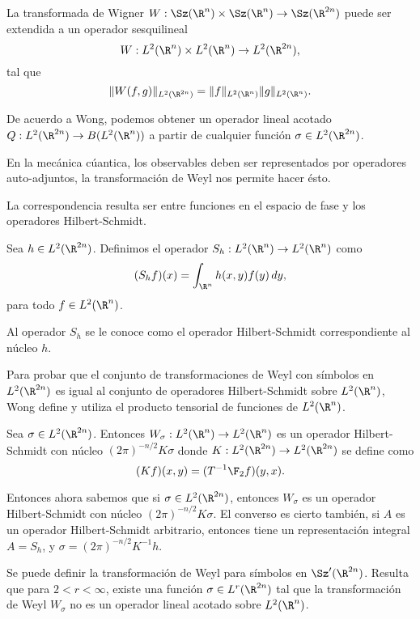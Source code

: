 La transformada de Wigner $W : \Sz(\R^{n}) \times
\Sz(\R^{n}) \to \Sz(\R^{2n})$ puede ser extendida a un
operador sesquilineal
\[
  W : L^2(\R^{n}) \times L^2(\R^{n}) \to L^2(\R^{2n}),
\] 
tal que
\[
  \|W(f,g)\|_{L^2(\R^{2n})}
  = \|f\|_{L^2(\R^{n})} \|g\|_{L^2(\R^{n})}.
\] 

De acuerdo a Wong, podemos obtener un operador lineal
acotado $Q : L^2(\R^{2n}) \to B(L^2(\R^{n}))$ a partir de
cualquier función $\sigma \in L^2(\R^{2n})$.

En la mecánica cúantica, los observables deben ser
representados por operadores auto-adjuntos, la
transformación de Weyl nos permite hacer ésto.

La correspondencia resulta ser entre funciones en el
espacio de fase y los operadores Hilbert-Schmidt.

\begin{definition}
  Sea $h \in L^2(\R^{2n})$. Definimos el operador $S_h :
  L^2(\R^{n}) \to L^2(\R^{n})$ como
  \begin{equation}
    (S_hf)(x)
    = \int_{\R^{n}} h(x,y) f(y) \, dy,
  \end{equation}
  para todo $f \in L^2(\R^{n})$.
\end{definition}
Al operador $S_h$ se le conoce como el operador
Hilbert-Schmidt correspondiente al núcleo $h$.

Para probar que el conjunto de transformaciones de Weyl
con símbolos en $L^2(\R^{2n})$ es igual al conjunto de
operadores Hilbert-Schmidt sobre $L^2(\R^{n})$, Wong
define y utiliza el producto tensorial de funciones de
$L^2(\R^{n})$.

\begin{theorem}
  Sea $\sigma \in L^2(\R^{2n})$. Entonces $W_\sigma :
  L^2(\R^{n}) \to L^2(\R^{n})$ es un operador
  Hilbert-Schmidt con núcleo $(2\pi)^{-n / 2}K \sigma$
  donde $K : L^2(\R^{2n}) \to L^2(\R^{2n})$ se define como
  \[
    (Kf)(x,y)
    = (T^{-1}\F_2 f)(y,x).
  \] 
\end{theorem}

Entonces ahora sabemos que si $\sigma \in L^2(\R^{2n})$,
entonces $W_\sigma$ es un operador Hilbert-Schmidt con
núcleo $(2\pi)^{-n / 2} K \sigma$. El converso es cierto
también, si $A$ es un operador Hilbert-Schmidt arbitrario,
entonces tiene un representación integral $A = S_h$, y
$\sigma = (2\pi)^{-n / 2} K^{-1}h$.

Se puede definir la transformación de Weyl para símbolos
en $\Sz'(\R^{2n})$. Resulta que para $2 < r < \infty$,
existe una función $\sigma \in L^{r}(\R^{2n})$ tal que la
transformación de Weyl $W_\sigma$ no es un operador lineal
acotado sobre $L^2(\R^{n})$.
